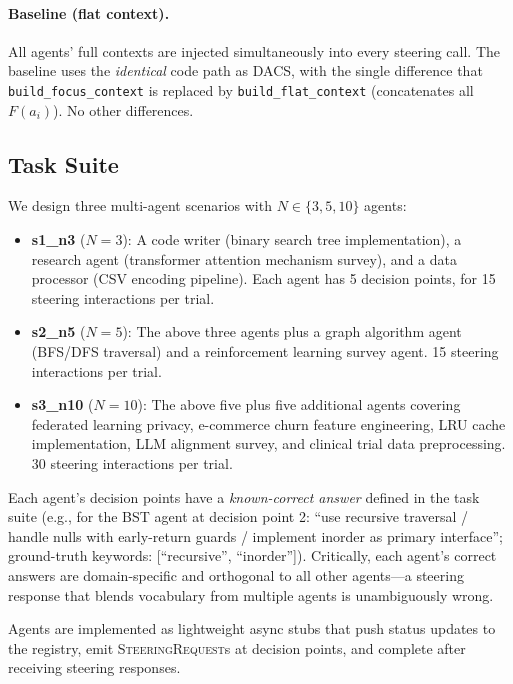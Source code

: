 \documentclass{article}
\begin{document}
\paragraph{Baseline (flat context).} All agents' full contexts are
injected simultaneously into every steering call.
The baseline uses the \emph{identical} code path as DACS, with the single
difference that \texttt{build\_focus\_context} is replaced by
\texttt{build\_flat\_context} (concatenates all $F(a_i)$).
No other differences.

\subsection{Task Suite}
\label{sec:tasks}

We design three multi-agent scenarios with $N \in \{3, 5, 10\}$ agents:

\begin{itemize}
  \item \textbf{s1\_n3} ($N=3$): A code writer (binary search tree
  implementation), a research agent (transformer attention mechanism
  survey), and a data processor (CSV encoding pipeline).
  Each agent has 5 decision points, for 15 steering interactions per
  trial.

  \item \textbf{s2\_n5} ($N=5$): The above three agents plus a graph
  algorithm agent (BFS/DFS traversal) and a reinforcement learning
  survey agent.
  15 steering interactions per trial.

  \item \textbf{s3\_n10} ($N=10$): The above five plus five additional
  agents covering federated learning privacy, e-commerce churn feature
  engineering, LRU cache implementation, LLM alignment survey, and
  clinical trial data preprocessing.
  30 steering interactions per trial.
\end{itemize}

\noindent Each agent's decision points have a \emph{known-correct answer}
defined in the task suite (e.g., for the BST agent at decision point 2:
``use recursive traversal / handle nulls with early-return guards /
implement inorder as primary interface''; ground-truth keywords: [``recursive'', ``inorder'']).
Critically, each agent's correct answers are domain-specific and
orthogonal to all other agents—a steering response that blends vocabulary
from multiple agents is unambiguously wrong.

Agents are implemented as lightweight async stubs that push status updates
to the registry, emit \textsc{SteeringRequest}s at decision points, and
complete after receiving steering responses.
\end{document}

